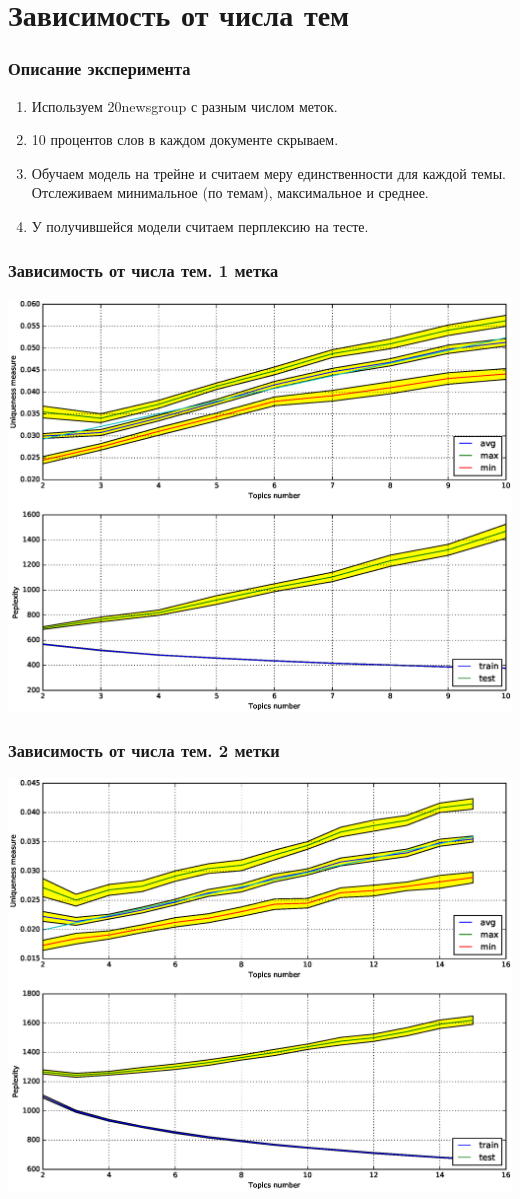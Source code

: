 \documentclass[utf8]{beamer}
\begin{document}
	\section{Зависимость от числа тем}
	\begin{frame}	
	\frametitle{Описание эксперимента}
	\begin{enumerate}
\item Используем 20newsgroup с разным числом меток.
\item 10 процентов слов в каждом документе скрываем.
\item Обучаем модель на трейне и считаем меру единственности для каждой темы. Отслеживаем минимальное (по темам), максимальное и среднее.
\item У получившейся модели считаем перплексию на тесте.
\end{enumerate}
	\end{frame}
	
	\begin{frame}	
	\frametitle{Зависимость от числа тем. 1 метка}
	\includegraphics[width=0.75\linewidth]{presentation_pictures/topics_dependency_origin_1_ums.eps} 
	\end{frame}
	
	\begin{frame}	
	\frametitle{Зависимость от числа тем. 2 метки}
	\includegraphics[width=0.75\linewidth]{presentation_pictures/topics_dependency_origin_2_ums.eps} 
	\end{frame}
	
\end{document}
